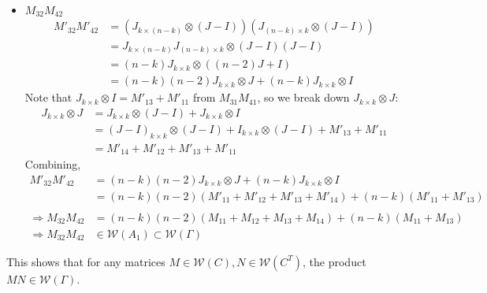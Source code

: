 \documentclass{article}
\begin{document}
\begin{itemize}
\begin{itemize}
\begin{itemize}
            \item $M_{32}M_{42}$
            \begin{align*}
                M'_{32}M'_{42}
                &= (J_{k\times(n-k)}\otimes (J-I))(J_{(n-k)\times k}\otimes (J-I)) \\
                &= J_{k\times(n-k)}J_{(n-k)\times k} \otimes (J-I)(J-I) \\
                &= (n-k)J_{k\times k}\otimes ((n-2)J+I) \\
                &= (n-k)(n-2)J_{k\times k}\otimes J + (n-k)J_{k\times k}\otimes I
            \end{align*}
            Note that $J_{k\times k}\otimes I = M'_{13} + M'_{11}$ from $M_{31}M_{41}$, so we break down $J_{k\times k}\otimes J$:
            \begin{align*}
                J_{k\times k}\otimes J
                &= J_{k\times k}\otimes (J-I) + J_{k\times k}\otimes I \\
                &= (J-I)_{k\times k}\otimes (J-I) + I_{k\times k}\otimes (J-I) + M'_{13} + M'_{11} \\
                &= M'_{14}+M'_{12}+M'_{13} + M'_{11}
            \end{align*}
            Combining,
            \begin{align*}
                M'_{32}M'_{42}
                &=(n-k)(n-2)J_{k\times k}\otimes J + (n-k)J_{k\times k}\otimes I \\
                &= (n-k)(n-2)(M'_{11}+M'_{12}+M'_{13} + M'_{14}) + (n-k)(M'_{11} + M'_{13}) \\\\
                \Rightarrow M_{32}M_{42} &= (n-k)(n-2)(M_{11}+M_{12}+M_{13} + M_{14}) + (n-k)(M_{11} + M_{13}) \\
                \Rightarrow M_{32}M_{42} &\in\mathcal{W}(A_1)\subset\mathcal{W}(\Gamma)
            \end{align*}
        \end{itemize}
        This shows that for any matrices $M\in\mathcal{W}(C),N \in \mathcal{W}(C^T)$, the product $MN \in\mathcal{W}(\Gamma)$.


\end{itemize}
\end{itemize}
\end{document}
